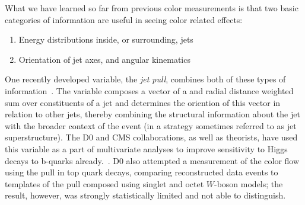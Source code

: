 What we have learned so far from previous color measurements is that two basic categories of information are useful in seeing color related effects:
%
\begin{enumerate}
\item Energy distributions inside, or surrounding, jets
\item Orientation of jet axes, and angular kinematics 
\end{enumerate}
%
One recently developed variable, the \textit{jet pull}, combines both of these types of information~\cite{Gallicchio:2010sw}. The variable composes a vector of a \pt and radial distance weighted sum over constituents of a jet and determines the oriention of this vector in relation to other jets, thereby combining the structural information about the jet with the broader context of the event (in a strategy sometimes referred to as jet superstructure). The D0 and CMS collaborations, as well as theorists, have used this variable as a part of multivariate analyses to improve sensitivity to Higgs decays to b-quarks already.~\cite{D0higgs,CMShiggspap,CMShiggspap2}. D0 also attempted a measurement of the color flow using the pull in top quark decays, comparing reconstructed data events to templates of the pull composed using singlet and octet $W$-boson models; the result, however, was strongly statistically limited and not able to distinguish.

